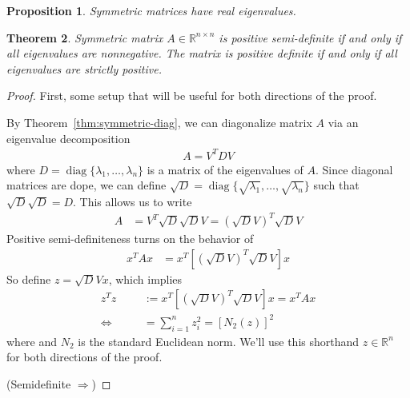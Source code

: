 \documentclass[12pt]{article}
\numberwithin{equation}{section} %
\theoremstyle{plain}
\newtheorem{thm}{Theorem}[section]
\newtheorem{prop}[thm]{Proposition}
\theoremstyle{definition}
\theoremstyle{remark}
\newcommand{\diag}{\operatorname{diag}}
\newcommand{\R}{\mathbb{R}}
\newcommand{\Rn}{\mathbb{R}^n}
\newcommand{\Rnn}{\mathbb{R}^{n\times n}}
\begin{document}
\begin{prop}
Symmetric matrices have \emph{real} eigenvalues.
\end{prop}

\begin{thm}
\label{thm:possemidef-eigenval}
Symmetric matrix $A\in\Rnn$ is positive semi-definite if and only if all
eigenvalues are nonnegative. The matrix is positive definite if and only
if all eigenvalues are strictly positive.
\end{thm}

\begin{proof}
First, some setup that will be useful for both directions of the proof.

By Theorem~\ref{thm:symmetric-diag}, we can diagonalize matrix $A$ via
an eigenvalue decomposition
\begin{align*}
  A = V^T D V
\end{align*}
where $D=\diag\{\lambda_1,\ldots,\lambda_n\}$ is a matrix of the
eigenvalues of $A$.  Since diagonal matrices are dope, we can define
$\sqrt{D}=\diag\{\sqrt{\lambda_1},\ldots,\sqrt{\lambda_n}\}$ such that
$\sqrt{D}\sqrt{D}=D$. This allows us to write
\begin{align*}
  A &= V^T \sqrt{D} \sqrt{D} V
  = \left(\sqrt{D} V\right)^T \sqrt{D} V
\end{align*}
Positive semi-definiteness turns on the behavior of
\begin{align*}
  x^T A x &=
  x^T  \left[\left(\sqrt{D} V\right)^T \sqrt{D} V\right] x
\end{align*}
So define $z = \sqrt{D}Vx$, which implies
\begin{align*}
  z^T z &:=x^T  \left[\left(\sqrt{D} V\right)^T \sqrt{D} V\right] x
  = x^T A x\\
  \Leftrightarrow \qquad
  &=  \sum^n_{i=1} z_i^2 = \left[N_2(z)\right]^2
\end{align*}
where and $N_2$ is the standard Euclidean norm. We'll
use this shorthand $z\in\Rn$ for both directions of the proof.

(Semidefinite $\Rightarrow$)



\end{proof}
\end{document}
